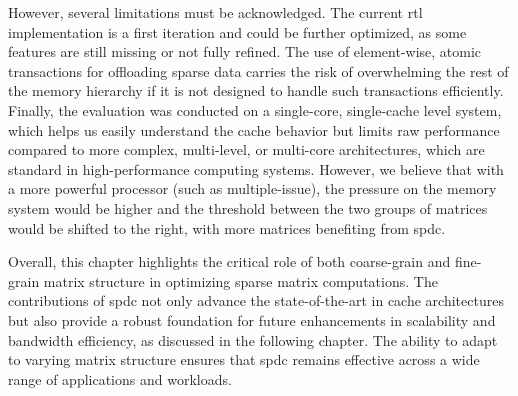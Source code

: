 However, several limitations must be acknowledged.
The current \acrshort{rtl} implementation is a first iteration and could be further optimized, as some features are still missing or not fully refined.
The use of element-wise, atomic transactions for offloading sparse data carries the risk of overwhelming the rest of the memory hierarchy if it is not designed to handle such transactions efficiently.
Finally, the evaluation was conducted on a single-core, single-cache level system, which helps us easily understand the cache behavior but limits raw performance compared to more complex, multi-level, or multi-core architectures, which are standard in high-performance computing systems.
However, we believe that with a more powerful processor (such as multiple-issue), the pressure on the memory system would be higher and the threshold between the two groups of matrices would be shifted to the right, with more matrices benefiting from \acrlong{spdc}.

Overall, this chapter highlights the critical role of both coarse-grain and fine-grain matrix structure in optimizing sparse matrix computations.
The contributions of \acrlong{spdc} not only advance the state-of-the-art in cache architectures but also provide a robust foundation for future enhancements in scalability and bandwidth efficiency, as discussed in the following chapter.
The ability to adapt to varying matrix structure ensures that \acrlong{spdc} remains effective across a wide range of applications and workloads.

\bigskip\bigskip

